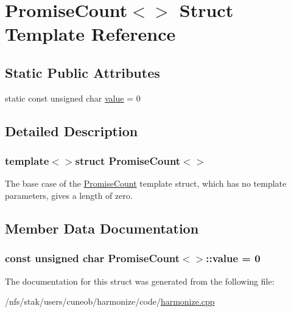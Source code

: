 \hypertarget{structPromiseCount_3_4}{\section{Promise\-Count$<$$>$ Struct Template Reference}
\label{structPromiseCount_3_4}
}
\subsection*{Static Public Attributes}
\begin{DoxyCompactItemize}
\item 
static const unsigned char \hyperlink{structPromiseCount_3_4_a2705da868b9db6339fe6e21f8f7ba081}{value} = 0
\end{DoxyCompactItemize}


\subsection{Detailed Description}
\subsubsection*{template$<$$>$struct Promise\-Count$<$$>$}

The base case of the {\ttfamily \hyperlink{structPromiseCount}{Promise\-Count}} template struct, which has no template parameters, gives a length of zero. 

\subsection{Member Data Documentation}
\hypertarget{structPromiseCount_3_4_a2705da868b9db6339fe6e21f8f7ba081}{
\subsubsection[{value}]{\setlength{\rightskip}{0pt plus 5cm}const unsigned char {\bf Promise\-Count}$<$$>$\-::value = 0\hspace{0.3cm}{\ttfamily [static]}}}\label{structPromiseCount_3_4_a2705da868b9db6339fe6e21f8f7ba081}


The documentation for this struct was generated from the following file\-:\begin{DoxyCompactItemize}
\item 
/nfs/stak/users/cuneob/harmonize/code/\hyperlink{harmonize_8cpp}{harmonize.\-cpp}\end{DoxyCompactItemize}
